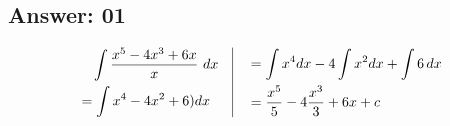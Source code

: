 \documentclass[17pt]{extarticle}
\begin{document}
\begin{fleqn}

\section{Answer: 01}

\begin{equation} \nonumber
\begin{alignedat}{4}
& \quad \int \frac{x^5 - 4x^3 + 6x}{x}\ dx\\
&= \int x^4 - 4x^2 +6)dx\\
\end{alignedat}
\quad
\vrule
\quad
\begin{alignedat}{4}
&= \int x^4dx - 4\int x^2dx +\int 6\,dx\\
&= \frac{x^5}{5}-4\frac{x^3}{3}+6x +c
\end{alignedat}
\end{equation}
\quad


\end{fleqn}
\end{document}

